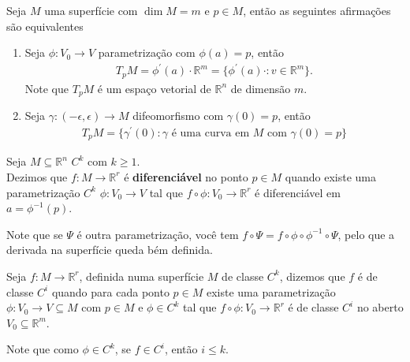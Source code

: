 \begin{note}
  Seja $M$ uma superfície com $\dim M=m$ e $p\in M$, então as seguintes afirmações são equivalentes
  \begin{enumerate}
    \item Seja $\phi:V_0\to V$ parametrização com $\phi(a)=p$, então
      \begin{align*}
        T_pM=\phi^{\prime}(a)\cdot \mathbb{R}^{m}=\{\phi^{\prime}(a)\cdot :v\in\mathbb{R}^{m}\}.
      \end{align*}
      Note que $T_pM$ é um espaço vetorial de $\mathbb{R}^{n}$ de dimensão $m$.
    \item Seja $\gamma:(-\epsilon,\epsilon)\to M$ difeomorfismo com $\gamma(0)=p$, então
      \begin{align*}
        T_p M=\{\gamma^{\prime}(0):\gamma\text{ é uma curva em $M$ com }\gamma(0)=p\}
      \end{align*}
  \end{enumerate}
\end{note}
\begin{definition}
  Seja $M\subseteq\mathbb{R}^{n}$ $C^{k}$ com $k\geq 1$.\\
  Dezimos que $f:M\to\mathbb{R}^{r}$ é \textbf{diferenciável} no ponto $p\in M$ quando existe uma parametrização $C^{k}$ $\phi:V_0\to V$ tal que $f\circ \phi:V_0\to\mathbb{R}^{r}$ é diferenciável em $a=\phi^{-1}(p)$.
  \begin{center}
      
  \end{center}
\end{definition}
\begin{note}
  Note que se $\Psi$ é outra parametrização, você tem $f\circ \Psi=f\circ \phi\circ \phi^{-1}\circ \Psi$, pelo que a derivada na superfície queda bém definida. 
\end{note}
\begin{definition}[$f$ de classe $C^{i}$]
  Seja $f:M\to\mathbb{R}^{r}$, definida numa superfície $M$ de classe $C^{k}$, dizemos que $f$ é de classe $C^{i}$ quando para cada ponto $p\in M$ existe uma parametrização $\phi:V_0\to V\subseteq M$ com $p\in M$ e $\phi\in C^{k}$ tal que $f\circ \phi:V_0\to\mathbb{R}^{r}$ é de classe $C^{i}$ no aberto $V_0\subseteq \mathbb{R}^{m}$. 
\end{definition}
\begin{note}
  Note que como $\phi\in C^{k}$, se $f\in C^{i}$, então $i\leq k$.  
\end{note}
